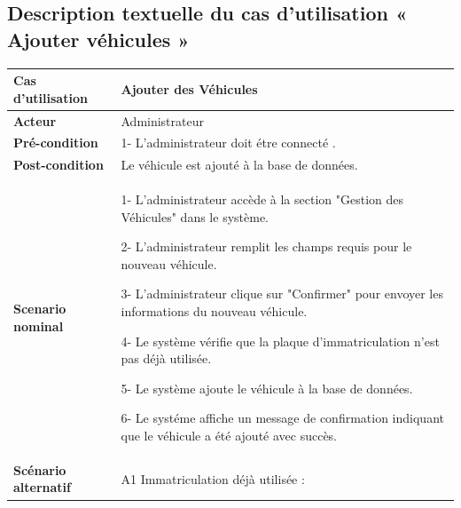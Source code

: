 
\subsection{Description textuelle du cas d’utilisation « Ajouter véhicules »}

\begin{table}[H]
  \centering
  \renewcommand{\arraystretch}{1.2} %
  \begin{tabular}{|p{4cm}|p{9cm}|}
    \hline
    \textbf{Cas d'utilisation}   & Ajouter des Véhicules                                                                    \\
    \hline
    \textbf{Acteur}              & Administrateur                                                                           \\
    \hline
    \textbf{Pré-condition}       & 1- L'administrateur doit étre connecté .                                                 \\
    \hline
    \textbf{Post-condition}      & Le véhicule est ajouté à la base de données.                                             \\
    \hline
    \textbf{Scenario nominal}    & 1- L'administrateur accède à la section "Gestion des Véhicules" dans le système.\newline

    2- L'administrateur remplit les champs requis pour le nouveau véhicule.\newline

    3- L'administrateur clique sur "Confirmer" pour envoyer les informations du nouveau véhicule.\newline

    4- Le système vérifie que la plaque d'immatriculation n'est pas déjà utilisée.\newline

    5- Le système ajoute le véhicule à la base de données. \newline

    6- Le systéme affiche un message de confirmation indiquant que le véhicule a été ajouté avec succès.                    \\

    \hline
    \textbf{Scénario alternatif} & A1 Immatriculation déjà utilisée : \newline


\end{tabular}
\end{table}
